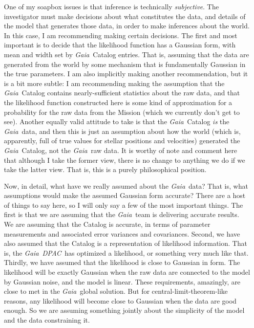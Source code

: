 \documentclass[12pt, modern]{aastex62h}
\newcommand{\acronym}[1]{{\small{#1}}}
\newcommand{\Gaia}{\textsl{Gaia}}
\newcommand{\DPAC}{\textsl{\acronym{DPAC}}}
\begin{document}
One of my soapbox issues is that inference is technically \emph{subjective}.
The investigator must make decisions about what constitutes the data,
and details of the model that generates those data, in order to make
inferences about the world.
In this case, I am recommending making certain decisions.
The first and most important is to decide that the likelihood function
has a Gaussian form, with mean and width set by \Gaia\ Catalog entries.
That is, assuming that the data are generated from the world by some mechanism
that is fundamentally Gaussian in the true parameters.
I am also implicitly making another recommendation, but it is a bit more
subtle:
I am recommending making the assumption that the \Gaia\ Catalog contains
nearly-sufficient statistics about the raw data, and that the likelihood function
constructed here is some kind of approximation for a probability for the raw data
from the Mission (which we currently don't get to see).
Another equally valid attitude to take is that the \Gaia\ Catalog
\emph{is}
the \Gaia\ data, and then this is just an assumption about how the world
(which is, apparently, full of true values for stellar positions and velocities)
generated the \Gaia\ Catalog, not the \Gaia\ raw data.
It is worthy of note and comment here that although I take the former view,
there is no change to anything we do if we take the latter view.
That is, this is a purely philosophical position.

Now, in detail, what have we really assumed about the \Gaia\ data?
That is, what assumptions would make the assumed Gaussian form accurate?
There are a host of things to say here, so I will only say a few of the
most important things.
The first is that we are assuming that the \Gaia\ team is delivering
accurate results.
We are assuming that the Catalog is accurate, in terms of parameter
measurements and associated error variances and covariances.
Second, we have also assumed that the Catalog is a representation of likelihood
information.
That is, the \Gaia\ \DPAC\ has optimized a likelihood, or something very much
like that.
Thirdly, we have assumed that the likelihood is close to Gaussian in form.
The likelihood will be exactly Gaussian when the raw data are connected
to the model by Gaussian noise, and the model is linear.
These requirements, amazingly, are close to met in the \Gaia\ global solution.
But for central-limit-theorem-like reasons, any likelihood will become close
to Gaussian when the data are good enough.
So we are assuming something jointly about the simplicity of the model and
the data constraining it.
\end{document}
